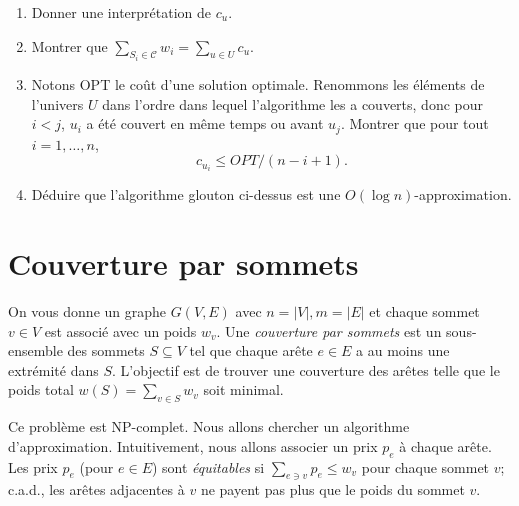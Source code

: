 \documentclass[12pt]{article}
\begin{document}
\begin{enumerate}
	\item Donner une interprétation de $c_{u}$.
	\item Montrer que $\sum_{S_{i} \in \mathcal{C}} w_{i} = \sum_{u \in U} c_{u}$.
	\item Notons OPT le coût d'une solution optimale. Renommons les éléments de l'univers $U$ dans l'ordre dans lequel l'algorithme les a couverts, donc pour $i<j$, $u_i$ a été couvert en même temps ou avant $u_j$.
	Montrer que pour tout $i=1,\ldots,n$, 
		$$
			c_{u_i} \leq OPT / (n-i+1).
		$$
	\item Déduire que l'algorithme glouton ci-dessus est une $O(\log n)$-approximation.
\end{enumerate}

\section{Couverture par sommets}

\begin{figwindow}
On vous donne un graphe $G(V,E)$ avec $n=|V| , m=|E|$ 
et chaque sommet $v \in V$ est associé avec un poids $w_{v}$.
Une \emph{couverture par sommets} est un sous-ensemble des sommets $S\subseteq V$ tel que
chaque arête $e \in E$ a au moins une extrémité dans $S$.
L'objectif est de trouver une couverture des arêtes telle que le poids total 
$w(S) = \sum_{v \in S} w_{v}$ soit minimal.
%

Ce problème est NP-complet. Nous allons chercher un algorithme d'approximation.
Intuitivement, nous allons associer un prix $p_{e}$ à chaque arête. Les prix $p_{e}$ (pour $e \in E$) sont 
\emph{équitables} si $\sum_{e\ni v} p_{e} \leq w_{v}$ pour chaque sommet $v$; c.a.d., 
les arêtes adjacentes à $v$ ne payent pas plus que le poids du sommet $v$. 
\end{figwindow}
\end{document}
